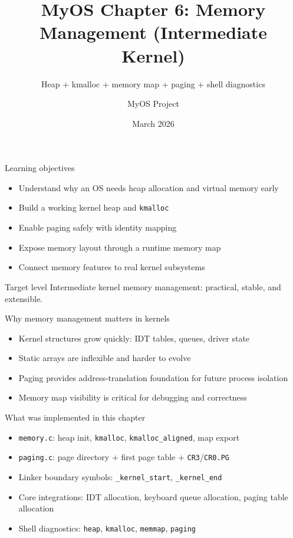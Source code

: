 \documentclass[aspectratio=169]{beamer}
\title[MyOS Chapter 6]{\textbf{MyOS Chapter 6: Memory Management (Intermediate Kernel)}}
\subtitle{Heap + kmalloc + memory map + paging + shell diagnostics}
\author{MyOS Project}
\date{March 2026}
\institute{x86 Protected Mode Kernel Engineering}
\newcommand{\concept}[2]{%
  \begin{block}{#1}\smallskip #2\smallskip\end{block}\vspace{5pt}}
\begin{document}
\begin{frame}
  \titlepage
\end{frame}

\begin{frame}{Learning objectives}
  \begin{itemize}
    \item Understand why an OS needs heap allocation and virtual memory early
    \item Build a working kernel heap and \texttt{kmalloc}
    \item Enable paging safely with identity mapping
    \item Expose memory layout through a runtime memory map
    \item Connect memory features to real kernel subsystems
  \end{itemize}
  \concept{Target level}{
    Intermediate kernel memory management: practical, stable, and extensible.
  }
\end{frame}

\begin{frame}{Why memory management matters in kernels}
  \begin{itemize}
    \item Kernel structures grow quickly: IDT tables, queues, driver state
    \item Static arrays are inflexible and harder to evolve
    \item Paging provides address-translation foundation for future process isolation
    \item Memory map visibility is critical for debugging and correctness
  \end{itemize}
\end{frame}

\begin{frame}{What was implemented in this chapter}
  \begin{itemize}
    \item \texttt{memory.c}: heap init, \texttt{kmalloc}, \texttt{kmalloc\_aligned}, map export
    \item \texttt{paging.c}: page directory + first page table + \texttt{CR3}/\texttt{CR0.PG}
    \item Linker boundary symbols: \texttt{\_kernel\_start}, \texttt{\_kernel\_end}
    \item Core integrations: IDT allocation, keyboard queue allocation, paging table allocation
    \item Shell diagnostics: \texttt{heap}, \texttt{kmalloc}, \texttt{memmap}, \texttt{paging}
  \end{itemize}
\end{frame}
\end{document}
